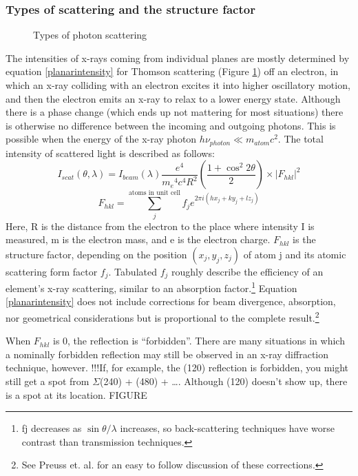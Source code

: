 \subsubsection{Types of scattering and the structure factor}
\begin{figure}[htbp]
  \centering
  
  \caption{Types of photon scattering}
  \label{ScatteringTypes}
\end{figure}
The intensities of x-rays coming from individual planes are mostly determined by equation \ref{planarintensity} for Thomson scattering (Figure \ref{ScatteringTypes}) off an electron, in which an x-ray colliding with an electron excites it into higher oscillatory motion, and then the electron emits an x-ray to relax to a lower energy state. Although there is a phase change (which ends up not mattering for most situations) there is otherwise no difference between the incoming and outgoing photons. This is possible when the energy of the x-ray photon $h\nu_{photon}\ll m_{atom}c^2$. The total intensity of scattered light is described as follows:
\begin{equation}
    I_{scat}(\theta,\lambda)=I_{beam}(\lambda)\frac{e^4}{{m_e}^4c^4R^2}(\frac{1+\cos^2{2\theta}}{2})\times|F_{hkl}|^2
    \label{planarintensity}
\end{equation}
\begin{equation}
    F_{hkl}= \sum_{j}^{\text{atoms in unit cell}} f_je^{2\pi i(hx_j+ky_j+lz_j)}
    \label{Fhkl}
\end{equation}
Here, R is the distance from the electron to the place where intensity I is measured, m is the electron mass, and e is the electron charge. $F_{hkl}$ is the structure factor, depending on the position $(x_j, y_j, z_j)$ of atom j and its atomic scattering form factor $f_j$. Tabulated $f_j$ roughly describe the efficiency of an element’s x-ray scattering, similar to an absorption factor.\footnote{fj decreases as $\sin\theta/\lambda$ increases, so back-scattering techniques have worse contrast than transmission techniques.} Equation \ref{planarintensity} does not include corrections for beam divergence, absorption, nor geometrical considerations but is proportional to the complete result.\footnote{See Preuss et. al. for an easy to follow discussion of these corrections.}

When $F_{hkl}$ is 0, the reflection is “forbidden”. There are many situations in which a nominally forbidden reflection may still be observed in an x-ray diffraction technique, however. !!!If, for example, the (120) reflection is forbidden, you might still get a spot from  $\Sigma$(240) + (480) + …. Although (120) doesn’t show up, there is a spot at its location. FIGURE

